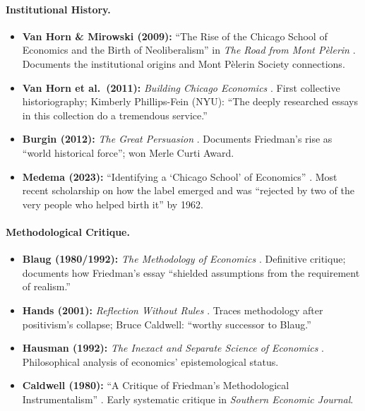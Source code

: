 \paragraph{Institutional History.}
\begin{itemize}[nosep]
    \item \textbf{Van Horn \& Mirowski (2009):} ``The Rise of the Chicago School of Economics
        and the Birth of Neoliberalism'' in \textit{The Road from Mont P\`{e}lerin}
        \citep{vanhorn2009rise}. Documents the institutional origins and Mont P\`{e}lerin
        Society connections.
    \item \textbf{Van Horn et al.\ (2011):} \textit{Building Chicago Economics}
        \citep{vanhorn2011building}. First collective historiography; Kimberly Phillips-Fein (NYU):
        ``The deeply researched essays in this collection do a tremendous service.''
    \item \textbf{Burgin (2012):} \textit{The Great Persuasion} \citep{burgin2012great}.
        Documents Friedman's rise as ``world historical force''; won Merle Curti Award.
    \item \textbf{Medema (2023):} ``Identifying a `Chicago School' of Economics''
        \citep{medema2023chicago}. Most recent scholarship on how the label emerged
        and was ``rejected by two of the very people who helped birth it'' by 1962.
\end{itemize}

\paragraph{Methodological Critique.}
\begin{itemize}[nosep]
    \item \textbf{Blaug (1980/1992):} \textit{The Methodology of Economics}
        \citep{blaug1992methodology}. Definitive critique; documents how Friedman's essay
        ``shielded assumptions from the requirement of realism.''
    \item \textbf{Hands (2001):} \textit{Reflection Without Rules} \citep{hands2001reflection}.
        Traces methodology after positivism's collapse; Bruce Caldwell: ``worthy
        successor to Blaug.''
    \item \textbf{Hausman (1992):} \textit{The Inexact and Separate Science of Economics}
        \citep{hausman1992inexact}. Philosophical analysis of economics' epistemological status.
    \item \textbf{Caldwell (1980):} ``A Critique of Friedman's Methodological
        Instrumentalism'' \citep{caldwell1980critique}. Early systematic critique in
        \textit{Southern Economic Journal}.
\end{itemize}

